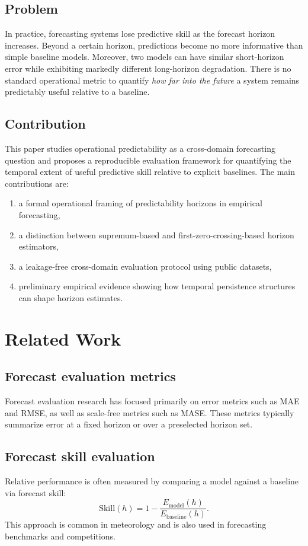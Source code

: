 \documentclass[11pt]{article}
\begin{document}
\subsection{Problem}
In practice, forecasting systems lose predictive skill as the forecast horizon increases. Beyond a certain horizon, predictions become no more informative than simple baseline models.
Moreover, two models can have similar short-horizon error while exhibiting markedly different long-horizon degradation.
There is no standard operational metric to quantify \emph{how far into the future} a system remains predictably useful relative to a baseline.

\subsection{Contribution}
This paper studies operational predictability as a cross-domain forecasting question and proposes a reproducible evaluation framework for quantifying the temporal extent of useful predictive skill relative to explicit baselines.
The main contributions are:
\begin{enumerate}
  \item a formal operational framing of predictability horizons in empirical forecasting,
  \item a distinction between supremum-based and first-zero-crossing-based horizon estimators,
  \item a leakage-free cross-domain evaluation protocol using public datasets,
  \item preliminary empirical evidence showing how temporal persistence structures can shape horizon estimates.
\end{enumerate}

\section{Related Work}

\subsection{Forecast evaluation metrics}
Forecast evaluation research has focused primarily on error metrics such as MAE and RMSE, as well as scale-free metrics such as MASE. These metrics typically summarize error at a fixed horizon or over a preselected horizon set.

\subsection{Forecast skill evaluation}
Relative performance is often measured by comparing a model against a baseline via forecast skill:
\begin{equation}
\mathrm{Skill}(h) = 1 - \frac{E_{\mathrm{model}}(h)}{E_{\mathrm{baseline}}(h)}.
\end{equation}
This approach is common in meteorology and is also used in forecasting benchmarks and competitions.
\end{document}
